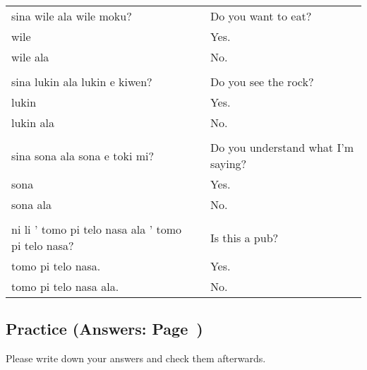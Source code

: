 \begin{supertabular}{p{5,5cm}|ll}
    sina wile ala wile moku?                           &  & Do you want to eat?                \\
    wile                                               &  & Yes.                               \\
    wile ala                                           &  & No.                                \\
                                                       &  &                                    \\
    sina lukin ala lukin e kiwen?                      &  & Do you see the rock?               \\
    lukin                                              &  & Yes.                               \\
    lukin ala                                          &  & No.                                \\
                                                       &  &                                    \\
    sina sona ala sona e toki mi?                      &  & Do you understand what I'm saying? \\
    sona                                               &  & Yes.                               \\
    sona ala                                           &  & No.                                \\
                                                       &  &                                    \\
    ni li ' tomo pi telo nasa ala ' tomo pi telo nasa? &  & Is this a pub?                     \\
    tomo pi telo nasa.                                 &  & Yes.                               \\
    tomo pi telo nasa ala.                             &  & No.                                \\
\end{supertabular}

\newpage

\subsection*{Practice (Answers: Page~\pageref{'negation_yes_no_questions'})}
Please write down your answers and check them afterwards.

